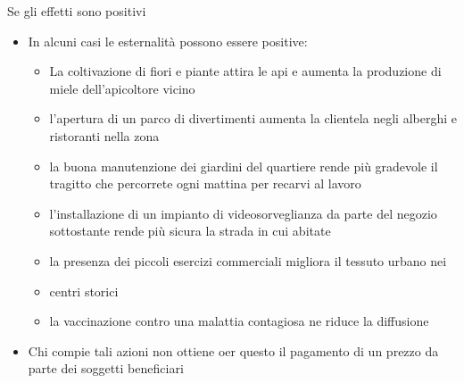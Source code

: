 \documentclass[aspectratio=64,11pt]{beamer}
\begin{document}
\begin{frame}{Se gli effetti sono positivi}
\begin{itemize}
\item In alcuni casi le esternalità possono essere positive:
\begin{itemize}
\item La coltivazione di fiori e piante attira le api e aumenta la produzione di
miele dell’apicoltore vicino
\item l’apertura di un parco di divertimenti aumenta la clientela negli alberghi
e ristoranti nella zona
\item la buona manutenzione dei giardini del quartiere rende più gradevole il
tragitto che percorrete ogni mattina per recarvi al lavoro
\item l’installazione di un impianto di videosorveglianza da parte del negozio
sottostante rende più sicura la strada in cui abitate
\item la presenza dei piccoli esercizi commerciali migliora il tessuto urbano
nei
\item centri storici
\item la vaccinazione contro una malattia contagiosa ne riduce la diffusione
\end{itemize}
\item Chi compie tali azioni non ottiene oer questo il pagamento di un prezzo da
parte dei soggetti beneficiari
\end{itemize}
\end{frame}
\end{document}
